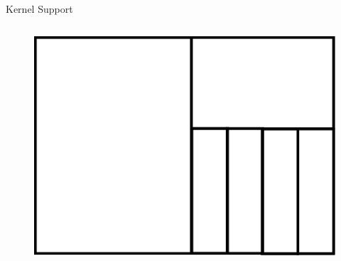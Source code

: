 \begin{frame}{Kernel Support}
\begin{columns}[C]
\begin{column}{.4\textwidth}
			\begin{figure}[hb]
				\centering
				\includegraphics[scale=0.2]{img/cgroups.png}
			\end{figure}
		\end{column}
	\end{columns}
\end{frame}